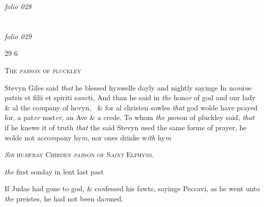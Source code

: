 \documentclass[12pt, a4paper]{book}
\begin{document}

\textit{folio 028}


         \vspace{4cm}
         
\dotfill
					  \section*{}

\textit{folio 029}
	
	\begin{flushright}{\color{Mahogany}29} 6\end{flushright}

               
				\begin{center} \begin{large} {\scshape The \textit{par}son of pluckley} \end{large} \end{center}
			

 
		\ifthenelse{\isodd{\thepage}}
		{\reversemarginpar}
		{\normalmarginpar}
		Stevyn Giles said \textit{that} he blessed hy\textit{m}selfe dayly and nightly
 sayinge In no\textit{m}i\textit{n}e patris et filii et spiriti s\textit{anc}ti, And than he said
 in \textit{the} hono\textit{r} of god and our lady \& al the co\textit{m}pany of hevyn, 
 \& for al christen sowles \textit{that} god wolde have prayed for,
 a pat\textit{er} nost\textit{er}, an Ave \& a crede. To whom \textit{the}
 	\textit{par}son of pluckley
 	said, \textit{that} if he knewe it of truth \textit{that} the said Stevyn
 used the same forme of prayer, he wolde not acco\textit{m}pany
 hy\textit{m}, nor ones drinke w\textit{ith} hy\textit{m} 
 

            
               
				\begin{center} \begin{large} {\scshape 
               	\textit{Sir} hu\textit{m}fray Chirden \textit{par}son of S\textit{aint} Elphyns.
 
                     \textit{the} first sonday in lent last past
               } \end{large} \end{center}
			

 
		\ifthenelse{\isodd{\thepage}}
		{\reversemarginpar}
		{\normalmarginpar}
		If Judas had gone to god, \& co\textit{n}fessed his fawte, sayinge
 Peccavi, as he went unto \textit{the} preistes, he had not
 been da\textit{m}ned.
 
\end{document}
